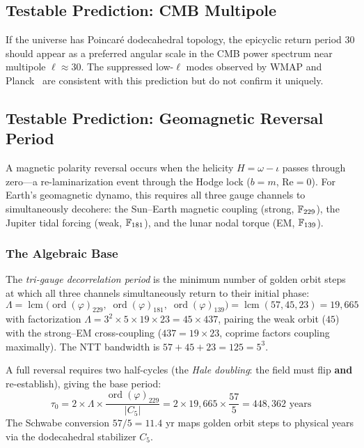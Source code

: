 \subsection{Testable Prediction: CMB Multipole}

If the universe has Poincar\'{e} dodecahedral topology, the epicyclic return period $30$ should appear as a preferred angular scale in the CMB power spectrum near multipole $\ell \approx 30$. The suppressed low-$\ell$ modes observed by WMAP and Planck~\cite{planck2020} are consistent with this prediction but do not confirm it uniquely.

\subsection{Testable Prediction: Geomagnetic Reversal Period}\label{sec:geomag}

A magnetic polarity reversal occurs when the helicity $H = \omega - \iota$ passes through zero---a re-laminarization event through the Hodge lock ($b = m$, $\mathrm{Re} = 0$). For Earth's geomagnetic dynamo, this requires all three gauge channels to simultaneously decohere: the Sun--Earth magnetic coupling (strong, $\mathbb{F}_{229}$), the Jupiter tidal forcing (weak, $\mathbb{F}_{181}$), and the lunar nodal torque (EM, $\mathbb{F}_{139}$).

\subsubsection{The Algebraic Base}

The \emph{tri-gauge decorrelation period} is the minimum number of golden orbit steps at which all three channels simultaneously return to their initial phase:
\begin{equation}\label{eq:trigauge_lcm}
    \Lambda = \operatorname{lcm}\bigl(\operatorname{ord}(\varphi)_{229},\; \operatorname{ord}(\varphi)_{181},\; \operatorname{ord}(\varphi)_{139}\bigr) = \operatorname{lcm}(57, 45, 23) = 19{,}665
\end{equation}
with factorization $\Lambda = 3^2 \times 5 \times 19 \times 23 = 45 \times 437$, pairing the weak orbit ($45$) with the strong--EM cross-coupling ($437 = 19 \times 23$, coprime factors coupling maximally). The NTT bandwidth is $57 + 45 + 23 = 125 = 5^3$.

A full reversal requires two half-cycles (the \emph{Hale doubling}: the field must flip \textbf{and} re-establish), giving the base period:
\begin{equation}\label{eq:reversal_base}
    \tau_0 = 2 \times \Lambda \times \frac{\operatorname{ord}(\varphi)_{229}}{|C_5|} = 2 \times 19{,}665 \times \frac{57}{5} = 448{,}362 \text{ years}
\end{equation}
The Schwabe conversion $57/5 = 11.4$ yr maps golden orbit steps to physical years via the dodecahedral stabilizer $C_5$.


